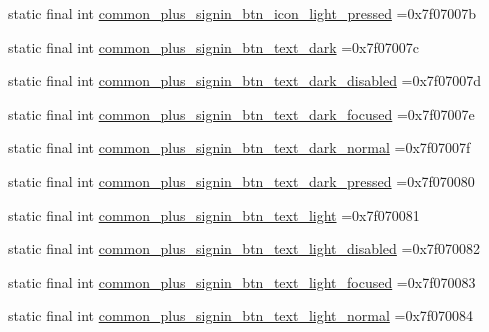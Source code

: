 \begin{DoxyCompactItemize}
\item 
static final int \mbox{\hyperlink{classbr_1_1unb_1_1cic_1_1mp_1_1marketmaster_1_1R_1_1drawable_a8c3ce8a49f356eb662d3a287b4ca9b9e}{common\+\_\+plus\+\_\+signin\+\_\+btn\+\_\+icon\+\_\+light\+\_\+pressed}} =0x7f07007b
\item 
static final int \mbox{\hyperlink{classbr_1_1unb_1_1cic_1_1mp_1_1marketmaster_1_1R_1_1drawable_a1827c3f98debde7bac54de2da8c34b7b}{common\+\_\+plus\+\_\+signin\+\_\+btn\+\_\+text\+\_\+dark}} =0x7f07007c
\item 
static final int \mbox{\hyperlink{classbr_1_1unb_1_1cic_1_1mp_1_1marketmaster_1_1R_1_1drawable_a27418e1863f43579c4e41222a360c6b0}{common\+\_\+plus\+\_\+signin\+\_\+btn\+\_\+text\+\_\+dark\+\_\+disabled}} =0x7f07007d
\item 
static final int \mbox{\hyperlink{classbr_1_1unb_1_1cic_1_1mp_1_1marketmaster_1_1R_1_1drawable_a084bfc0d8b7086d04402cf7eb33829ce}{common\+\_\+plus\+\_\+signin\+\_\+btn\+\_\+text\+\_\+dark\+\_\+focused}} =0x7f07007e
\item 
static final int \mbox{\hyperlink{classbr_1_1unb_1_1cic_1_1mp_1_1marketmaster_1_1R_1_1drawable_afaa3b09619d443cc29321648a12aae09}{common\+\_\+plus\+\_\+signin\+\_\+btn\+\_\+text\+\_\+dark\+\_\+normal}} =0x7f07007f
\item 
static final int \mbox{\hyperlink{classbr_1_1unb_1_1cic_1_1mp_1_1marketmaster_1_1R_1_1drawable_ab2e217658d41183f9b3c8928e8c913b9}{common\+\_\+plus\+\_\+signin\+\_\+btn\+\_\+text\+\_\+dark\+\_\+pressed}} =0x7f070080
\item 
static final int \mbox{\hyperlink{classbr_1_1unb_1_1cic_1_1mp_1_1marketmaster_1_1R_1_1drawable_ac9c1f754b37a9f4c486dfebd4034776b}{common\+\_\+plus\+\_\+signin\+\_\+btn\+\_\+text\+\_\+light}} =0x7f070081
\item 
static final int \mbox{\hyperlink{classbr_1_1unb_1_1cic_1_1mp_1_1marketmaster_1_1R_1_1drawable_a13f3464cffd254d7d6063712cb1f8112}{common\+\_\+plus\+\_\+signin\+\_\+btn\+\_\+text\+\_\+light\+\_\+disabled}} =0x7f070082
\item 
static final int \mbox{\hyperlink{classbr_1_1unb_1_1cic_1_1mp_1_1marketmaster_1_1R_1_1drawable_a1c308ea93b8dc2cda634f2ffbf34cf8d}{common\+\_\+plus\+\_\+signin\+\_\+btn\+\_\+text\+\_\+light\+\_\+focused}} =0x7f070083
\item 
static final int \mbox{\hyperlink{classbr_1_1unb_1_1cic_1_1mp_1_1marketmaster_1_1R_1_1drawable_abdbe9ad33d452bebb68765f2edb96449}{common\+\_\+plus\+\_\+signin\+\_\+btn\+\_\+text\+\_\+light\+\_\+normal}} =0x7f070084
\item 

\end{DoxyCompactItemize}
